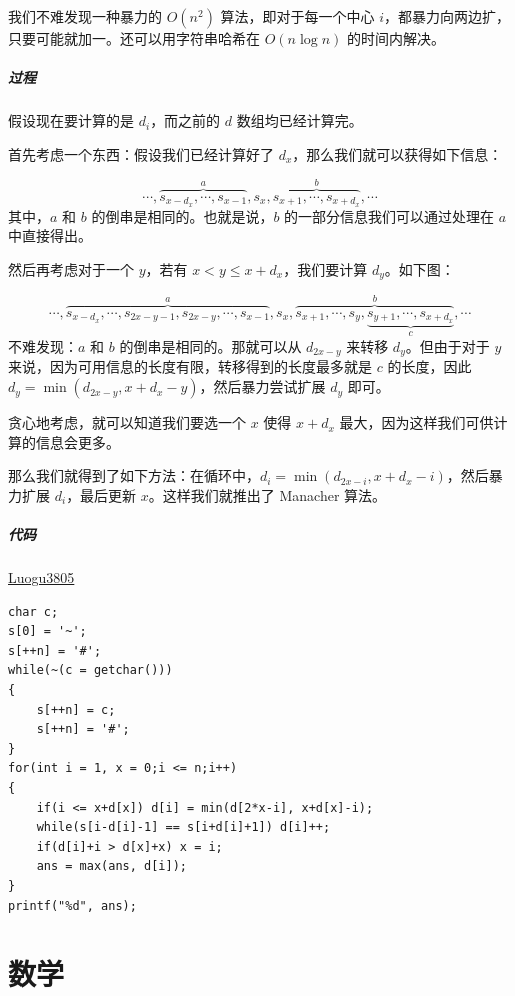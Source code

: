 \documentclass[10pt,twoside,a4paper,UTF8]{ctexbook}
\begin{document}
	我们不难发现一种暴力的 $O(n^2)$ 算法，即对于每一个中心 $i$，都暴力向两边扩，只要可能就加一。还可以用字符串哈希在 $O(n\log n)$ 的时间内解决。
	
	\subsubsection{过程}
	假设现在要计算的是 $d_i$，而之前的 $d$ 数组均已经计算完。
	
	首先考虑一个东西：假设我们已经计算好了 $d_x$，那么我们就可以获得如下信息：
	
	$$
		\cdots, \overbrace{s_{x-d_x}, \cdots, s_{x-1}}^{a}, s_x, \overbrace{s_{x+1}, \cdots, s_{x+d_x}}^{b}, \cdots
	$$
	其中，$a$ 和 $b$ 的倒串是相同的。也就是说，$b$ 的一部分信息我们可以通过处理在 $a$ 中直接得出。
	
	然后再考虑对于一个 $y$，若有 $x < y \le x + d_x$，我们要计算 $d_y$。如下图：
	
	$$
		\cdots, \overbrace{s_{x-d_x}, \cdots, s_{2x-y-1}, s_{2x-y}, \cdots, s_{x-1}}^a, s_x, \overbrace{s_{x+1}, \cdots, s_y, \underbrace{s_{y+1}, \cdots, s_{x+d_x}}_c}^b, \cdots
	$$
	不难发现：$a$ 和 $b$ 的倒串是相同的。那就可以从 $d_{2x-y}$ 来转移 $d_y$。但由于对于 $y$ 来说，因为可用信息的长度有限，转移得到的长度最多就是 $c$ 的长度，因此 $d_y = \min(d_{2x-y}, x+d_x-y)$，然后暴力尝试扩展 $d_y$ 即可。
	
	贪心地考虑，就可以知道我们要选一个 $x$ 使得 $x+d_x$ 最大，因为这样我们可供计算的信息会更多。
	
	那么我们就得到了如下方法：在循环中，$d_i = \min(d_{2x-i}, x+d_x-i)$，然后暴力扩展 $d_i$，最后更新 $x$。这样我们就推出了 Manacher 算法。
	
	\subsubsection{代码}
	\href{https://www.luogu.com.cn/problem/P3805}{Luogu3805}
	
	\begin{lstlisting}
char c;
s[0] = '~';
s[++n] = '#';
while(~(c = getchar()))
{
	s[++n] = c;
	s[++n] = '#';
}
for(int i = 1, x = 0;i <= n;i++)
{
	if(i <= x+d[x]) d[i] = min(d[2*x-i], x+d[x]-i);
	while(s[i-d[i]-1] == s[i+d[i]+1]) d[i]++;
	if(d[i]+i > d[x]+x) x = i;
	ans = max(ans, d[i]);
}
printf("%d", ans);
	\end{lstlisting}
	
	
	\part{数学}
\end{document}

